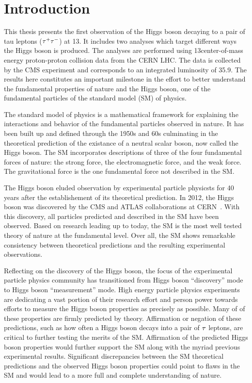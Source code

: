 \chapter{Introduction}
\label{sec:introduction}

This thesis presents the first observation of the Higgs boson decaying to a pair
of tau leptons ($\tau^{+}\tau^{-}$) at 13\TeV. It includes two analyses which target different
ways the Higgs boson is produced. The analyses are performed using
13\TeV center-of-mass energy proton-proton collision data from the CERN LHC.
The data is collected by the CMS experiment and corresponds to an integrated
luminosity of 35.9\fbinv. The results here constitutes an important
milestone in the effort to better understand the fundamental properties of nature and
the Higgs boson, one of the fundamental particles of the standard model (SM) of physics.

The standard model of physics is a mathematical framework for explaining
the interactions and behavior of the fundamental particles observed in nature.
It has been built up and defined through the 1950s and 60s culminating in the
theoretical prediction of the existance of a neutral scalar boson, now called the
Higgs boson.
The SM incorporates descriptions of three of the four fundamental forces of nature:
the strong force, the electromagnetic force, and the weak force.
The gravitational force is the one fundamental force not described in the SM. 

The Higgs boson eluded observation by experimental particle physicsts
for 40 years after the establishement of its theoretical prediction. 
In 2012, the Higgs boson was discovered 
by the CMS and ATLAS collaborations at CERN~\cite{Aad:2012tfa, Chatrchyan:2012xdj, Chatrchyan:2013lba}.
With this discovery, all particles predicted and described in the SM have been observed.
Based on research leading up to today, the SM is the most well tested theory of nature at the fundamental level.
Over all, the SM shows remarkable consistency between theoretical predictions and
the resulting experimental observations.

Reflecting on the discovery of the Higgs boson, the focus of the experimental particle physics community has transitioned from
Higgs boson ``discovery'' mode to Higgs boson ``measurement'' mode. High energy particle physics experiments
are dedicating a vast portion of their research effort and person power towards
efforts to measure the Higgs boson properties as precisely as possible. Many 
of of these properties are firmly predicted by theory. Affirmation or negation of these predictions,
such as how often a Higgs boson decays into a pair of $\tau$ leptons,
are critical to further testing the merits of the SM. Affirmation of the
predicted Higgs boson properties would further support the SM along with the myriad previous
experimental results. Significant discrepancies between the SM
theoretical predictions and the observed Higgs boson properties could point to
flaws in the SM and would lead to a more full and complete understanding of nature.


